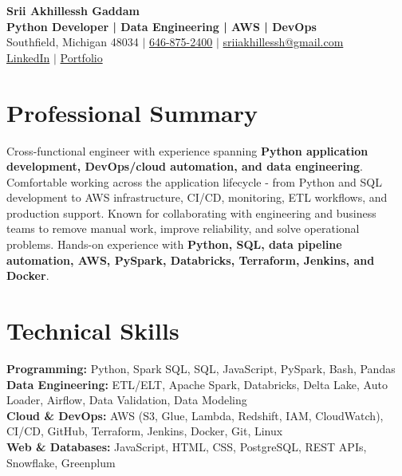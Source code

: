 \documentclass[letterpaper,10pt]{article}
\begin{document}
\fontsize{9.35pt}{10.45pt}\selectfont

\begin{center}
    {\LARGE \textbf{Srii Akhillessh Gaddam}} \\[-1pt]
    \textbf{Python Developer | Data Engineering | AWS | DevOps} \\[2pt]
    Southfield, Michigan 48034 $|$
    \href{tel:6468752400}{646-875-2400} $|$
    \href{mailto:sriiakhillessh@gmail.com}{sriiakhillessh@gmail.com} \\[1pt]
    \href{https://www.linkedin.com/in/srii-akhiilessh-gaddam-b48668191/}{LinkedIn} $|$
    \href{https://sriiakhillesshg.github.io/portfolio/}{Portfolio}
\end{center}
\vspace{-8pt}

\section{Professional Summary}
\small{Cross-functional engineer with experience spanning \textbf{Python application development, DevOps/cloud automation, and data engineering}. Comfortable working across the application lifecycle - from Python and SQL development to AWS infrastructure, CI/CD, monitoring, ETL workflows, and production support. Known for collaborating with engineering and business teams to remove manual work, improve reliability, and solve operational problems. Hands-on experience with \textbf{Python, SQL, data pipeline automation, AWS, PySpark, Databricks, Terraform, Jenkins, and Docker}.}

\section{Technical Skills}
\small{
\textbf{Programming:} Python, Spark SQL, SQL, JavaScript, PySpark, Bash, Pandas \\
\textbf{Data Engineering:} ETL/ELT, Apache Spark, Databricks, Delta Lake, Auto Loader, Airflow, Data Validation, Data Modeling \\
\textbf{Cloud \& DevOps:} AWS (S3, Glue, Lambda, Redshift, IAM, CloudWatch), CI/CD, GitHub, Terraform, Jenkins, Docker, Git, Linux \\
\textbf{Web \& Databases:} JavaScript, HTML, CSS, PostgreSQL, REST APIs, Snowflake, Greenplum
}
\end{document}
